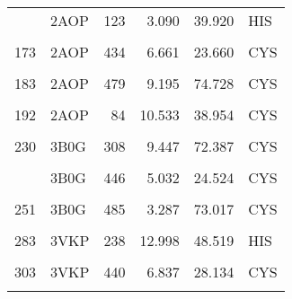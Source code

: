 \begin{table}
\begin{tabular}{llrrrl}
			\addlinespace
			144 & 2AOP & 123 & 3.090 & 39.920 & HIS\\
			\cellcolor{gray!6}{166} & \cellcolor{gray!6}{2AOP} & \cellcolor{gray!6}{309} & \cellcolor{gray!6}{7.118} & \cellcolor{gray!6}{45.159} & \cellcolor{gray!6}{TYR}\\
			173 & 2AOP & 434 & 6.661 & 23.660 & CYS\\
			\cellcolor{gray!6}{179} & \cellcolor{gray!6}{2AOP} & \cellcolor{gray!6}{440} & \cellcolor{gray!6}{6.319} & \cellcolor{gray!6}{36.167} & \cellcolor{gray!6}{CYS}\\
			183 & 2AOP & 479 & 9.195 & 74.728 & CYS\\
			\addlinespace
			\cellcolor{gray!6}{187} & \cellcolor{gray!6}{2AOP} & \cellcolor{gray!6}{483} & \cellcolor{gray!6}{3.190} & \cellcolor{gray!6}{85.931} & \cellcolor{gray!6}{CYS}\\
			192 & 2AOP & 84 & 10.533 & 38.954 & CYS\\
			\cellcolor{gray!6}{217} & \cellcolor{gray!6}{3B0G} & \cellcolor{gray!6}{238} & \cellcolor{gray!6}{11.585} & \cellcolor{gray!6}{50.847} & \cellcolor{gray!6}{HIS}\\
			230 & 3B0G & 308 & 9.447 & 72.387 & CYS\\
			\cellcolor{gray!6}{237} & \cellcolor{gray!6}{3B0G} & \cellcolor{gray!6}{440} & \cellcolor{gray!6}{7.055} & \cellcolor{gray!6}{40.691} & \cellcolor{gray!6}{CYS}\\
			\addlinespace
			241 & 3B0G & 446 & 5.032 & 24.524 & CYS\\
			\cellcolor{gray!6}{247} & \cellcolor{gray!6}{3B0G} & \cellcolor{gray!6}{481} & \cellcolor{gray!6}{9.209} & \cellcolor{gray!6}{57.400} & \cellcolor{gray!6}{CYS}\\
			251 & 3B0G & 485 & 3.287 & 73.017 & CYS\\
			\cellcolor{gray!6}{257} & \cellcolor{gray!6}{3B0G} & \cellcolor{gray!6}{97} & \cellcolor{gray!6}{7.720} & \cellcolor{gray!6}{46.114} & \cellcolor{gray!6}{HIS}\\
			283 & 3VKP & 238 & 12.998 & 48.519 & HIS\\
			\addlinespace
			\cellcolor{gray!6}{296} & \cellcolor{gray!6}{3VKP} & \cellcolor{gray!6}{308} & \cellcolor{gray!6}{8.440} & \cellcolor{gray!6}{84.519} & \cellcolor{gray!6}{CYS}\\
			303 & 3VKP & 440 & 6.837 & 28.134 & CYS\\
			\cellcolor{gray!6}{307} & \cellcolor{gray!6}{3VKP} & \cellcolor{gray!6}{446} & \cellcolor{gray!6}{5.941} & \cellcolor{gray!6}{35.235} & \cellcolor{gray!6}{CYS}\\

\end{tabular}
\end{table}
